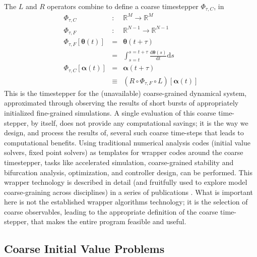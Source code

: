 \documentclass[numbers]{frontiersSCNS}
\renewcommand{\vec}[1]{\bm{#1}}
\newcommand{\diff}{\mathrm{d}}  %
\newcommand{\numNodes}{{N}}
\newcommand{\numCofs}{{M}}
\DeclareRobustCommand{\inTstep}{\tau}
\begin{document}
The $L$ and $R$ operators combine to define a
coarse timestepper $\Phi_{{\inTstep}, C}$, in
%
\begin{equation}
 \label{eqn:coarseTimestepper}
 \begin{array}{rcl}
 \Phi_{{\inTstep},C} &:& \mathbb R^\numCofs \rightarrow \mathbb R^\numCofs
 \\
 \Phi_{{\inTstep},F} &:& \mathbb R^{\numNodes-1} \rightarrow \mathbb R^{\numNodes-1}
 \\
 \Phi_{{\inTstep},F}[\vec\theta(t)]
 &=& \vec\theta(t+{\inTstep})
 \\
 &=&
%
 \int_{s=t}^{s=t+{\inTstep}}
 \frac{\diff \vec \theta(s)}{\diff t}
 \diff s
%
%
%
 \\
 \Phi_{{\inTstep},C}[\vec\alpha(t)]
 &=&
 \vec \alpha(t + {\inTstep})
 \\
 &\equiv&
 \left(
 R
 \circ
 \Phi_{{\inTstep},F}
\circ
 L
 \right)
 [\vec\alpha(t)]
 \end{array}
\end{equation}
%
This is the timestepper for the (unavailable) coarse-grained dynamical system, approximated
through observing the results of short bursts of appropriately
initialized fine-grained simulations.
%
A single evaluation of this coarse time-stepper, by itself, does not provide any computational
savings; it is the way we design, and process the results of, several such
coarse time-steps that leads to computational benefits.
%
Using traditional numerical analysis codes (initial value solvers, fixed point solvers)
as templates for wrapper codes around the coarse timestepper, tasks like
accelerated simulation, coarse-grained stability and bifurcation analysis,
optimization, and controller design, can be performed.
%
This wrapper technology is described in detail (and fruitfully used to explore
model coarse-graining across disciplines) in a series of publications \cite{Theodoropoulos2000,Kevrekidis2010}.
%
%
%
%
What is important here is not the established wrapper algorithms technology;
it is the selection of coarse observables, leading to the appropriate definition
of the coarse time-stepper, that makes the entire program feasible and useful.



\subsection{Coarse Initial Value Problems}
\label{sec:IVP}
\end{document}

